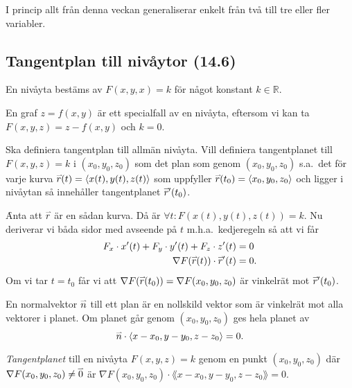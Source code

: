 \documentclass[a4paper]{article}
\begin{document}
\begin{anm}
    I princip allt från denna veckan generaliserar enkelt från två till 
    tre eller fler variabler.
\end{anm}

\subsection{Tangentplan till nivåytor (14.6)}
En nivåyta bestäms av \(
    F(x,y,x) = k
\) för något konstant \(
    k \in \mathbb{R}
\).

En graf \(
    z = f(x,y)
\) är ett specialfall av en nivåyta, eftersom vi kan ta \(
    F(x,y,z) = z - f(x,y)
\) och \(
    k = 0
\).

Ska definiera tangentplan till allmän nivåyta. Vill definiera tangentplanet till
\(
    F(x,y,z) = k
\) i \(
    (x_0, y_0, z_0)
\) som det plan som genom \(
    (x_0, y_0, z_0)
\) s.a.\ det för varje kurva \(
    \accentset{\rightharpoonup}{r} (t) = \left\langle x(t), y(t), z(t)\right\rangle
\) som uppfyller \(
    \accentset{\rightharpoonup}{r}(t_0) = \left\langle x_0, y_0, z_0\right\rangle
\) och ligger i nivåytan så innehåller tangentplanet \(
    \accentset{\rightharpoonup}{r} ' (t_0)
\). 

\f

Anta att \(
    \accentset{\rightharpoonup}{r} 
\) är en sådan kurva. Då är \(
    \forall t : F(x(t), y(t), z(t)) = k
\). Nu deriverar vi båda sidor med avseende på \(
    t
\) m.h.a.\ kedjeregeln så att vi får 
\begin{align*}
    F_x\cdot x'(t) + F_y \cdot y'(t) + F_z \cdot z'(t) &= 0 \\
    \nabla F(\accentset{\rightharpoonup}{r}(t) ) \cdot \accentset{\rightharpoonup}{r} '(t) &= 0.
\end{align*}
Om vi tar \(
    t = t_0
\) får vi att \(
    \nabla F(\accentset{\rightharpoonup}{r} (t_0)) = \nabla F(x_0, y_0, z_0) 
\) är vinkelrät mot \(
    \accentset{\rightharpoonup}{r} '(t_0)
\).

\begin{påm}
    En normalvektor \(
        \accentset{\rightharpoonup}{n} 
    \) till ett plan är en nollskild vektor som är vinkelrät mot alla vektorer 
    i planet. Om planet går genom \(
        (x_0, y_0, z_0)
    \) ges hela planet av \[
        \accentset{\rightharpoonup}{n} \cdot \left\langle x-x_0, y-y_0, z-z_0\right\rangle = 0.
    \]
\end{påm}

\begin{defn}
    \emph{Tangentplanet} till en nivåyta \(
        F(x,y,z) = k
    \) genom en punkt \(
        (x_0, y_0, z_0)
    \) där \(
        \nabla F(x_0,y_0,z_0) \neq \accentset{\rightharpoonup}{0} 
    \) är \(
        \nabla F(x_0, y_0, z_0) \cdot \lang x-x_0, y-y_0, z-z_0\rang = 0
    \).
\end{defn}
\end{document}
